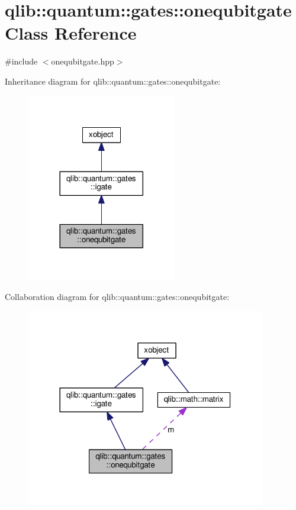 \hypertarget{classqlib_1_1quantum_1_1gates_1_1onequbitgate}{}\section{qlib\+:\+:quantum\+:\+:gates\+:\+:onequbitgate Class Reference}
\label{classqlib_1_1quantum_1_1gates_1_1onequbitgate}


{\ttfamily \#include $<$onequbitgate.\+hpp$>$}



Inheritance diagram for qlib\+:\+:quantum\+:\+:gates\+:\+:onequbitgate\+:\nopagebreak
\begin{figure}[H]
\begin{center}
\leavevmode
\includegraphics[width=185pt]{classqlib_1_1quantum_1_1gates_1_1onequbitgate__inherit__graph}
\end{center}
\end{figure}


Collaboration diagram for qlib\+:\+:quantum\+:\+:gates\+:\+:onequbitgate\+:\nopagebreak
\begin{figure}[H]
\begin{center}
\leavevmode
\includegraphics[width=296pt]{classqlib_1_1quantum_1_1gates_1_1onequbitgate__coll__graph}
\end{center}
\end{figure}
